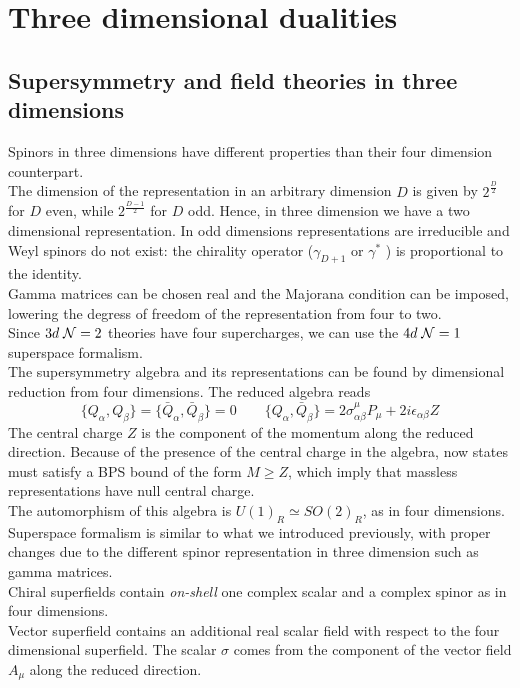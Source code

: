 

\chapter{Three dimensional dualities}
\section{Supersymmetry and field theories in three dimensions}
Spinors in three dimensions have different properties than their four dimension counterpart.\\
The dimension of the representation in an arbitrary dimension $D$  is given by $2^{\frac{D}{2}} $
for $D$ even, while $2^{\frac{D-1}{2}} $ for $D$ odd.
Hence, in three dimension we have a two dimensional representation.
In odd dimensions representations are irreducible and Weyl spinors do not exist: the chirality operator ($\gamma_{D+1}$ or $\gamma^*$ ) is proportional to the identity.
\\
Gamma matrices can be chosen real and the Majorana condition can be imposed, lowering the degress of freedom of the representation from four to two.\\
Since $3d \; \mathcal{N}=2$ theories have four supercharges, we can use the $4d \; \mathcal{N}=1$ superspace formalism. 
\\
The supersymmetry algebra and its representations can be found by dimensional reduction from four dimensions. 
The reduced algebra reads
\begin{equation}
 \{ Q_{\alpha},Q_{\beta} \} =  \{ \bar{Q}_{\alpha},\bar{Q}_{\beta} \}= 0 \qquad \{ Q_{\alpha} , \bar{Q}_{\beta}   \} = 2 \sigma^{\mu}_{\alpha \beta} P_{\mu} + 2 i \epsilon_{\alpha \beta} Z
 \end{equation} 
The central charge $Z$ is the component of the momentum  along the reduced direction.
Because of the presence of the central charge in the algebra, now states must satisfy a BPS bound of the form $M \geq Z $, which imply that massless representations have null central charge.
\\
The automorphism of this algebra is $U(1)_R \simeq SO(2)_R$, as in four dimensions.
\\
Superspace formalism is similar to what we introduced previously, with proper changes due to the different spinor representation in three dimension such as gamma matrices.
\\
Chiral superfields contain \emph{on-shell} one complex scalar and a complex spinor as in four dimensions.\\
Vector superfield contains an additional real scalar field with respect to the four dimensional superfield.
The scalar $\sigma $ comes from the component of the vector field $A_{\mu}$ along the reduced direction.









